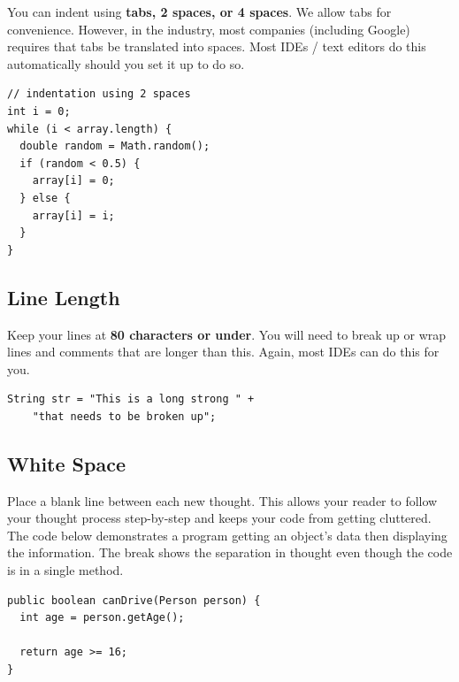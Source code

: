 \documentclass[11pt,DIV=23,landscape]{scrartcl}
\begin{document}
\begin{paracol}{2}
\begin{leftcolumn}
You can indent using \textbf{tabs, 2 spaces, or 4 spaces}. We allow tabs
for convenience. However, in the industry, most companies (including
Google) requires that tabs be translated into spaces. Most IDEs / text
editors do this automatically should you set it up to do so.
\end{leftcolumn}

\begin{rightcolumn}
\begin{lstlisting}
// indentation using 2 spaces
int i = 0;
while (i < array.length) {
  double random = Math.random();
  if (random < 0.5) {
    array[i] = 0;
  } else {
    array[i] = i;
  }
}
\end{lstlisting}
\end{rightcolumn}
\end{paracol}

\subsection{Line Length}\label{line-length}

\begin{paracol}{2}
\begin{leftcolumn}
Keep your lines at \textbf{80 characters or under}. You will need to
break up or wrap lines and comments that are longer than this. Again,
most IDEs can do this for you.
\end{leftcolumn}

\begin{rightcolumn}
\begin{lstlisting}
String str = "This is a long strong " +
    "that needs to be broken up";
\end{lstlisting}
\end{rightcolumn}
\end{paracol}

\subsection{White Space}\label{white-space}

\begin{paracol}{2}
\begin{leftcolumn}
Place a blank line between each new thought. This allows your reader to
follow your thought process step-by-step and keeps your code from
getting cluttered. The code below demonstrates a program getting an
object's data then displaying the information. The break shows the
separation in thought even though the code is in a single method.
\end{leftcolumn}

\begin{rightcolumn}
\begin{lstlisting}
public boolean canDrive(Person person) {
  int age = person.getAge();

  return age >= 16;
}
\end{lstlisting}
\end{rightcolumn}
\end{paracol}
\end{document}
